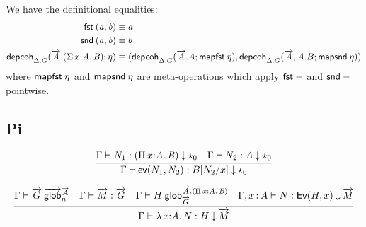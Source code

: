 We have the definitional equalities:
\[\begin{aligned}
\mathit{\mathsf{fst} \: (a,b)} &\equiv a \\
\mathit{\mathsf{snd} \: (a,b)} &\equiv b \\
\mathsf{depcoh}_{\Delta.\overline{G}} ({\overrightarrow{A}.(\textnormal{$\Sigma$}\,x {:} A.\,\mathit{B})};{\eta}) &\equiv
(\mathsf{depcoh}_{\Delta.\overline{G}} ({\overrightarrow{A}.A};{\mathit{\mathsf{mapfst} \: \eta}}),
\mathsf{depcoh}_{\Delta.\overline{G}} ({\overrightarrow{A},A.B};{\mathit{\mathsf{mapsnd} \: \eta}})) \\
\end{aligned}\]
where $\mathit{\mathsf{mapfst} \: \eta}$ and $\mathit{\mathsf{mapsnd} \: \eta}$ are meta-operations which apply $\mathit{\mathsf{fst} \: -}$
and $\mathit{\mathsf{snd} \: -}$ pointwise.


\subsection{Pi}

\[
\infer
  {\ofdepglob{\Gamma}{\ev{N_1}{N_2}}{B[N_2/x]}{\unitglobelt 0}}
  {\ofdepglob{\Gamma}{N_1}{(\picl xAB)}{\unitglobelt 0}
  &\ofdepglob{\Gamma}{N_2}{A}{\unitglobelt 0}}
\]

\begin{small}\[
\infer
  {\ofdepglob{\Gamma}{\lam xAN}{H}{\tel M}}
  {\wfglob{\Gamma}{\tel G}{\tel A}n
  &\ofglob{\Gamma}{\tel M}{\tel G}
  &\wfdepglob{\Gamma}{H}{\tel A.(\picl xAB)}{\tel G}
  &\ofdepglob{\Gamma,\tptm xA}{N}{\Ev Hx}{\tel M}}
\]\end{small}



%
%
%
%

